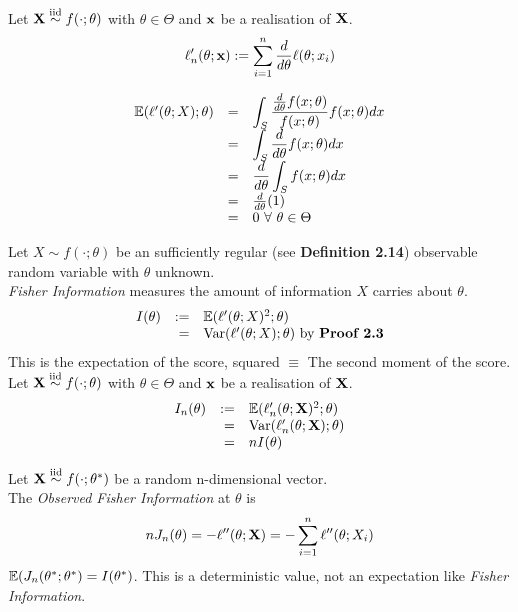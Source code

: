 \documentclass[11pt,a4paper]{article}
\begin{document}
Let $\textbf{X}\overset{\text{iid}}{\sim} f(\cdot;\theta)$ with $\theta\in\Theta$ and $\textbf{x}$ be a realisation of $\textbf{X}$.
$$\ell'_n(\theta;\textbf{x}):=\sum_{i=1}^n\frac{d}{d\theta}\ell(\theta;x_i)$$

\[\begin{array}{rcl}
\mathbb{E}(\ell'(\theta;X);\theta)&=&{\displaystyle\int_S\dfrac{\frac{d}{d\theta}f(x;\theta)}{f(x;\theta)}f(x;\theta)dx}\\
&=&{\displaystyle\int_S\frac{d}{d\theta}f(x;\theta)dx}\\
&=&{\displaystyle\frac{d}{d\theta}\int_Sf(x;\theta)dx}\\
&=&\frac{d}{d\theta}(1)\\
&=&0\ \forall\ \theta\in\Theta
\end{array}\]

Let $X\sim f(\cdot;\theta)$ be an sufficiently regular (see \textbf{Definition 2.14}) observable random variable with $\theta$ unknown.\\
\textit{Fisher Information} measures the amount of information $X$ carries about $\theta$.
\[\begin{array}{rrl}
I(\theta)&:=&\mathbb{E}(\ell'(\theta;X)^2;\theta)\\
&=&\mathrm{Var}(\ell'(\theta;X);\theta)\text{ by \textbf{Proof 2.3}}
\end{array}\]
\nb This is the expectation of the score, squared $\equiv$ The second moment of the score.\\

Let $\textbf{X}\overset{\text{iid}}{\sim} f(\cdot;\theta)$ with $\theta\in\Theta$ and $\textbf{x}$ be a realisation of $\textbf{X}$.
\[\begin{array}{rrl}
I_n(\theta)&:=&\mathbb{E}(\ell'_n(\theta;\textbf{X})^2;\theta)\\
&=&\mathrm{Var}(\ell'_n(\theta;\textbf{X});\theta)\\
&=&nI(\theta)
\end{array}\]

Let $\textbf{X}\overset{\text{iid}}{\sim} f(\cdot;\theta^*)$ be a random n-dimensional vector.\\
The \textit{Observed Fisher Information} at $\theta$ is
$$nJ_n(\theta)=-\ell''(\theta;\textbf{X})=-\sum_{i=1}^n\ell''(\theta;X_i)$$
\nb $\mathbb{E}(J_n(\theta^*;\theta^*)=I(\theta^*)$. This is a deterministic value, not an expectation like \textit{Fisher Information}.\\
\end{document}
